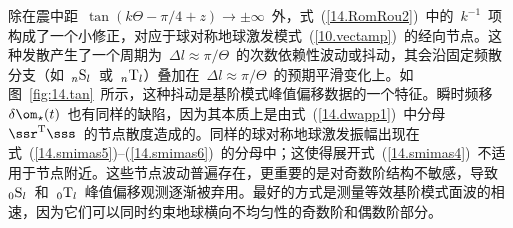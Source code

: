 除在震中距~$\tan(k\Theta-\pi/4+z)\rightarrow\pm\infty$~外，式~(\ref{14.RomRou2})~中的~$k^{-1}$~项构成了一个小修正，对应于球对称地球激发模式~(\ref{10.vectamp})~的经向节点。这种发散产生了一个周期为~$\Delta l\approx\pi/\Theta$~的次数依赖性波动或抖动，其会沿固定频散分支（如~${}_n{\rm S}_l$~或~${}_n{\rm T}_l$）叠加在~$\Delta l\approx\pi/\Theta$~的预期平滑变化上。如图~\ref{fig:14.tan}~所示，这种抖动是基阶模式峰值偏移数据的一个特征。瞬时频移~$\delta\om_{\star}(t)$~也有同样的缺陷，因为其本质上是由式~(\ref{14.dwapp1})~中分母~$\ssr^{\rm T}\sss$~的节点散度造成的。同样的球对称地球激发振幅出现在式~(\ref{14.smimas5})--(\ref{14.smimas6})~的分母中；这使得展开式~(\ref{14.smimas4})~不适用于节点附近。这些节点波动普遍存在，更重要的是对奇数阶结构不敏感，导致~${}_0{\rm S}_l$~和~${}_0{\rm T}_l$~峰值偏移观测逐渐被弃用。最好的方式是测量等效基阶模式面波的相速，因为它们可以同时约束地球横向不均匀性的奇数阶和偶数阶部分。

\renewcommand{\thesubsection}{$\!\!\!\raise1.3ex\hbox{$\star$}\!\!$
\arabic{chapter}.\arabic{section}.\arabic{subsection}}
